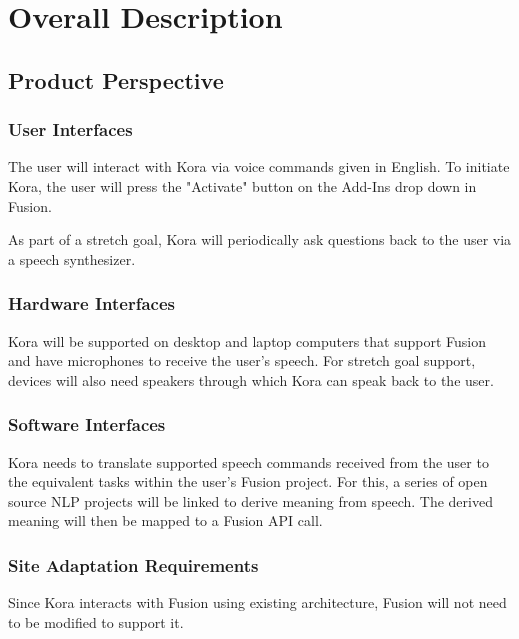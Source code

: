 \documentclass[onecolumn, draftclsnofoot,10pt, compsoc]{IEEEtran}
\def \botname{Kora\xspace}
\begin{document}
\section{Overall Description}
    \subsection{Product Perspective}

        \subsubsection{User Interfaces}
            The user will interact with \botname via voice commands given in English. 
            To initiate \botname, the user will press the "Activate" button on the Add-Ins drop down in Fusion. 

            As part of a stretch goal, \botname will periodically ask questions back to the user via a speech synthesizer.

        \subsubsection{Hardware Interfaces} 
            \botname will be supported on desktop and laptop computers that support Fusion and have microphones to receive the user's speech.
            For stretch goal support, devices will also need speakers through which \botname can speak back to the user.

        \subsubsection{Software Interfaces}               
            \botname needs to translate supported speech commands received from the user to the equivalent tasks within the user's Fusion project.
            For this, a series of open source NLP projects will be linked to derive meaning from speech.
            The derived meaning will then be mapped to a Fusion API call.

        \subsubsection{Site Adaptation Requirements} 
            Since \botname interacts with Fusion using existing architecture, Fusion will not need to be modified to support it. 
\end{document}
